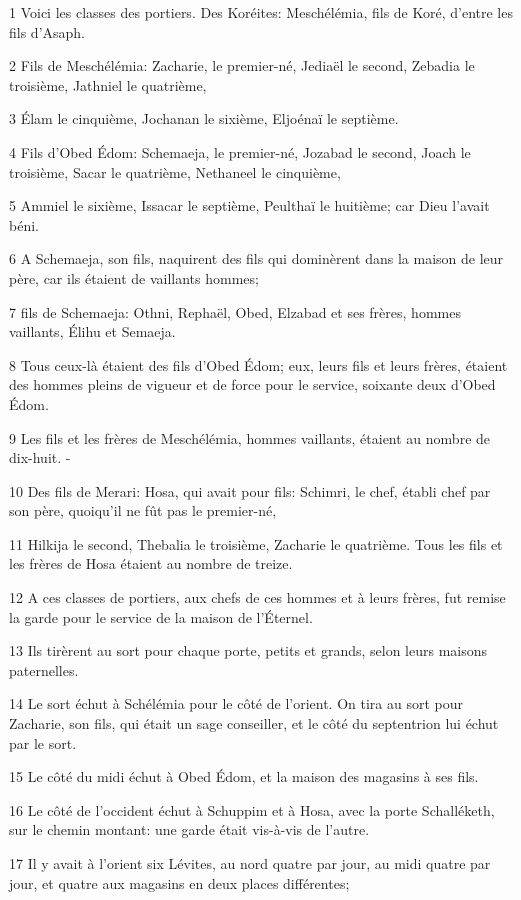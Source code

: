 \par 1 Voici les classes des portiers. Des Koréites: Meschélémia, fils de Koré, d'entre les fils d'Asaph.
\par 2 Fils de Meschélémia: Zacharie, le premier-né, Jediaël le second, Zebadia le troisième, Jathniel le quatrième,
\par 3 Élam le cinquième, Jochanan le sixième, Eljoénaï le septième.
\par 4 Fils d'Obed Édom: Schemaeja, le premier-né, Jozabad le second, Joach le troisième, Sacar le quatrième, Nethaneel le cinquième,
\par 5 Ammiel le sixième, Issacar le septième, Peulthaï le huitième; car Dieu l'avait béni.
\par 6 A Schemaeja, son fils, naquirent des fils qui dominèrent dans la maison de leur père, car ils étaient de vaillants hommes;
\par 7 fils de Schemaeja: Othni, Rephaël, Obed, Elzabad et ses frères, hommes vaillants, Élihu et Semaeja.
\par 8 Tous ceux-là étaient des fils d'Obed Édom; eux, leurs fils et leurs frères, étaient des hommes pleins de vigueur et de force pour le service, soixante deux d'Obed Édom.
\par 9 Les fils et les frères de Meschélémia, hommes vaillants, étaient au nombre de dix-huit. -
\par 10 Des fils de Merari: Hosa, qui avait pour fils: Schimri, le chef, établi chef par son père, quoiqu'il ne fût pas le premier-né,
\par 11 Hilkija le second, Thebalia le troisième, Zacharie le quatrième. Tous les fils et les frères de Hosa étaient au nombre de treize.
\par 12 A ces classes de portiers, aux chefs de ces hommes et à leurs frères, fut remise la garde pour le service de la maison de l'Éternel.
\par 13 Ils tirèrent au sort pour chaque porte, petits et grands, selon leurs maisons paternelles.
\par 14 Le sort échut à Schélémia pour le côté de l'orient. On tira au sort pour Zacharie, son fils, qui était un sage conseiller, et le côté du septentrion lui échut par le sort.
\par 15 Le côté du midi échut à Obed Édom, et la maison des magasins à ses fils.
\par 16 Le côté de l'occident échut à Schuppim et à Hosa, avec la porte Schalléketh, sur le chemin montant: une garde était vis-à-vis de l'autre.
\par 17 Il y avait à l'orient six Lévites, au nord quatre par jour, au midi quatre par jour, et quatre aux magasins en deux places différentes;
